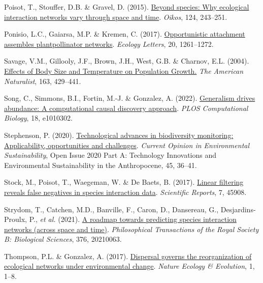 \documentclass[10pt,oneside]{article}
\newlength{\cslhangindent}
\newenvironment{CSLReferences}[3] %
 {%
  \setlength{\parindent}{0pt}
  \ifodd #1 \everypar{\setlength{\hangindent}{\cslhangindent}}\ignorespaces\fi
  \ifnum #2 > 0
  \setlength{\parskip}{#2\baselineskip}
  \fi
 }%
 {}
\begin{document}
\begin{CSLReferences}{1}{0}
\leavevmode{}%
Poisot, T., Stouffer, D.B. \& Gravel, D. (2015).
\href{https://doi.org/10.1111/oik.01719}{Beyond species: Why ecological
interaction networks vary through space and time}. \emph{Oikos}, 124,
243--251.

\leavevmode{}%
Ponisio, L.C., Gaiarsa, M.P. \& Kremen, C. (2017).
\href{https://doi.org/10.1111/ele.12821}{Opportunistic attachment
assembles plantpollinator networks}. \emph{Ecology Letters}, 20,
1261--1272.

\leavevmode{}%
Savage, V.M., Gillooly, J.F., Brown, J.H., West, G.B. \& Charnov, E.L.
(2004). \href{https://doi.org/10.1086/381872}{Effects of Body Size and
Temperature on Population Growth.} \emph{The American Naturalist}, 163,
429--441.

\leavevmode{}%
Song, C., Simmons, B.I., Fortin, M.-J. \& Gonzalez, A. (2022).
\href{https://doi.org/10.1371/journal.pcbi.1010302}{Generalism drives
abundance: A computational causal discovery approach}. \emph{PLOS
Computational Biology}, 18, e1010302.

\leavevmode{}%
Stephenson, P. (2020).
\href{https://doi.org/10.1016/j.cosust.2020.08.005}{Technological
advances in biodiversity monitoring: Applicability, opportunities and
challenges}. \emph{Current Opinion in Environmental Sustainability},
Open Issue 2020 Part A: Technology Innovations and Environmental
Sustainability in the Anthropocene, 45, 36--41.

\leavevmode{}%
Stock, M., Poisot, T., Waegeman, W. \& De Baets, B. (2017).
\href{https://doi.org/10.1038/srep45908}{Linear filtering reveals false
negatives in species interaction data}. \emph{Scientific Reports}, 7,
45908.

\leavevmode{}%
Strydom, T., Catchen, M.D., Banville, F., Caron, D., Dansereau, G.,
Desjardins-Proulx, P., \emph{et al.} (2021).
\href{https://doi.org/10.1098/rstb.2021.0063}{A roadmap towards
predicting species interaction networks (across space and time)}.
\emph{Philosophical Transactions of the Royal Society B: Biological
Sciences}, 376, 20210063.

\leavevmode{}%
Thompson, P.L. \& Gonzalez, A. (2017).
\href{https://doi.org/10.1038/s41559-017-0162}{Dispersal governs the
reorganization of ecological networks under environmental change}.
\emph{Nature Ecology \& Evolution}, 1, 1--8.


\end{CSLReferences}
\end{document}
